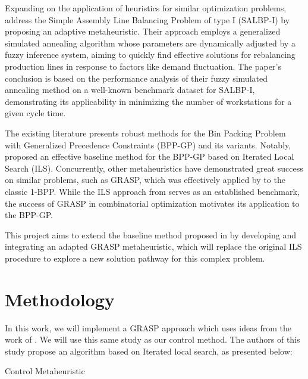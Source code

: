 \documentclass[12pt]{article}
\begin{document}
Expanding on the application of heuristics for similar optimization problems, \cite{lalaoui:18} address 
the Simple Assembly Line Balancing Problem of type I (SALBP-I) by proposing an adaptive metaheuristic. 
Their approach employs a generalized simulated annealing algorithm whose parameters are dynamically 
adjusted by a fuzzy inference system, aiming to quickly find effective solutions for rebalancing 
production lines in response to factors like demand fluctuation. The paper's conclusion is based on 
the performance analysis of their fuzzy simulated annealing method on a well-known benchmark dataset 
for SALBP-I, demonstrating its applicability in minimizing the number of workstations for a given 
cycle time.

The existing literature presents robust methods for the Bin Packing Problem with Generalized Precedence Constraints (BPP-GP) and its variants.
 Notably, \cite{kramer:17} proposed an effective baseline method for the BPP-GP based on Iterated Local Search (ILS). Concurrently, other 
 metaheuristics have demonstrated great success on similar problems, such as GRASP, which was effectively applied by \cite{layeb:12} to the 
 classic 1-BPP. While the ILS approach from \cite{kramer:17} serves as an established benchmark, the success of GRASP in combinatorial 
 optimization motivates its application to the BPP-GP.

This project aims to extend the baseline method proposed in \cite{kramer:17} by developing and integrating an adapted GRASP metaheuristic, 
which will replace the original ILS procedure to explore a new solution pathway for this complex problem.

\newpage
\section{Methodology}

In this work, we will implement a GRASP approach which uses ideas from the work of \cite{kramer:17}. We will use this same study as our control method. The authors of this study propose an algorithm based on Iterated local search, as presented below:

\begin{algorithm}[H]
  \footnotesize
{}
\caption{Control Metaheuristic}
\end{algorithm}
\end{document}
